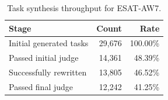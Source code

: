 \begin{table}[t]
\centering
\small
\begin{tabular}{lrr}
\toprule
\textbf{Stage} & \textbf{Count} & \textbf{Rate} \\
\midrule
Initial generated tasks & 29,676 & 100.00\% \\
Passed initial judge & 14,361 & 48.39\% \\
Successfully rewritten & 13,805 & 46.52\% \\
Passed final judge & 12,242 & 41.25\% \\
\bottomrule
\end{tabular}
\caption{Task synthesis throughput for \textsc{ESAT}-AW7.}
\label{tab:task_synthesis_stats}
\end{table}
